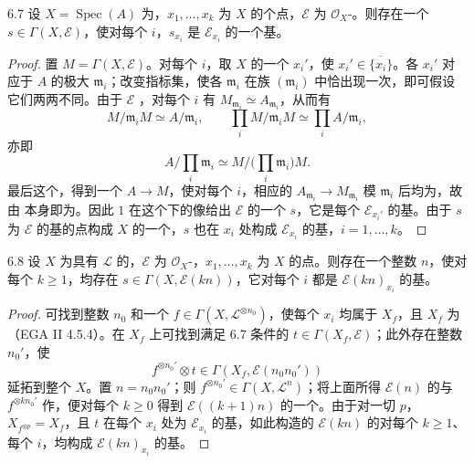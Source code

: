\begin{SGAresult}{}{6.7}
设 $X=\operatorname{Spec}(A)$ 为，$x_1,\ldots,x_k$ 为 $X$ 的个点，$\mathcal E$ 为 $\mathcal O_X$-。则存在一个 $s\in\Gamma(X,\mathcal E)$，使对每个 $i$，$s_{x_i}$ 是 $\mathcal E_{x_i}$ 的一个基。
\end{SGAresult}
\begin{proof}
置 $M=\Gamma(X,\mathcal E)$。对每个 $i$，取 $X$ 的一个 $x_i'$，使 $x_i'\in\overline{\{x_i\}}$。各 $x_i'$ 对应于 $A$ 的极大 $\mathfrak m_i$；改变指标集，使各 $\mathfrak m_i$ 在族 $(\mathfrak m_i)$ 中恰出现一次，即可假设它们两两不同。由于 $\mathcal E$ ，对每个 $i$ 有 $M_{\mathfrak m_i}\simeq A_{\mathfrak m_i}$，从而有
\[
M/\mathfrak m_iM\simeq A/\mathfrak m_i,\qquad
\prod_iM/\mathfrak m_iM\simeq\prod_iA/\mathfrak m_i,
\]
亦即
\[
A/\prod_i\mathfrak m_i\simeq M/\bigl(\prod_i\mathfrak m_i\bigr)M.
\]
最后这个，得到一个 $A\longrightarrow M$，使对每个 $i$，相应的 $A_{\mathfrak m_i}\longrightarrow M_{\mathfrak m_i}$ 模 $\mathfrak m_i$ 后均为，故由 本身即为。因此 $1$ 在这个下的像给出 $\mathcal E$ 的一个 $s$，它是每个 $\mathcal E_{x_i'}$ 的基。由于 $s$ 为 $\mathcal E$ 的基的点构成 $X$ 的一个，$s$ 也在 $x_i$ 处构成 $\mathcal E_{x_i}$ 的基，$i=1,\ldots,k$。
\end{proof}

\begin{SGAresult}{}{6.8}
设 $X$ 为具有 $\mathcal L$ 的，$\mathcal E$ 为 $\mathcal O_X$-，$x_1,\ldots,x_k$ 为 $X$ 的点。则存在一个整数 $n$，使对每个 $k\geq1$，均存在 $s\in\Gamma(X,\mathcal E(kn))$，它对每个 $i$ 都是 $\mathcal E(kn)_{x_i}$ 的基。
\end{SGAresult}
\begin{proof}
可找到整数 $n_0$ 和一个 $f\in\Gamma(X,\mathcal L^{\otimes n_0})$，使每个 $x_i$ 均属于 $X_f$，且 $X_f$ 为（EGA II 4.5.4）。在 $X_f$ 上可找到满足 6.7 条件的 $t\in\Gamma(X_f,\mathcal E)$；此外存在整数 $n_0'$，使
\[
f^{\otimes n_0'}\otimes t\in\Gamma(X_f,\mathcal E(n_0n_0'))
\]
延拓到整个 $X$。置 $n=n_0n_0'$；则 $f^{\otimes n_0'}\in\Gamma(X,\mathcal L^n)$；将上面所得 $\mathcal E(n)$ 的与 $f^{\otimes kn_0'}$ 作，便对每个 $k\geq0$ 得到 $\mathcal E((k+1)n)$ 的一个。由于对一切 $p$，$X_{f^{\otimes p}}=X_f$，且 $t$ 在每个 $x_i$ 处为 $\mathcal E_{x_i}$ 的基，如此构造的 $\mathcal E(kn)$ 的对每个 $k\geq1$、每个 $i$，均构成 $\mathcal E(kn)_{x_i}$ 的基。
\end{proof}

